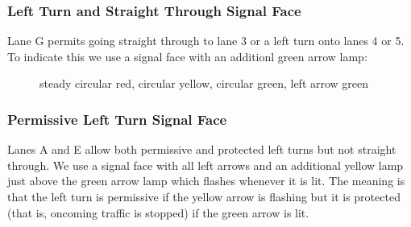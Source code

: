 \documentclass[letterpaper,twoside]{article}
\begin{document}
\subsubsection{Left Turn and Straight Through Signal Face}

Lane G permits going straight through to lane 3 or a left turn onto lanes
4 or 5.  To indicate this we use a signal face with an additionl green
arrow lamp:

\begin{figure}[H]
           {\caption{steady circular red, circular yellow, circular green,
               left arrow green}\label{fig:signal_cccl}}
\end{figure}

\subsubsection{Permissive Left Turn Signal Face}

Lanes A and E allow both permissive and protected left turns but not
straight through.  We use a signal face with all left arrows and an
additional yellow lamp just above the green arrow lamp which flashes
whenever it is lit.  The meaning is that the left turn is permissive
if the yellow arrow is flashing but it is  protected (that is, oncoming traffic
is stopped) if the green arrow is lit.
\end{document}
